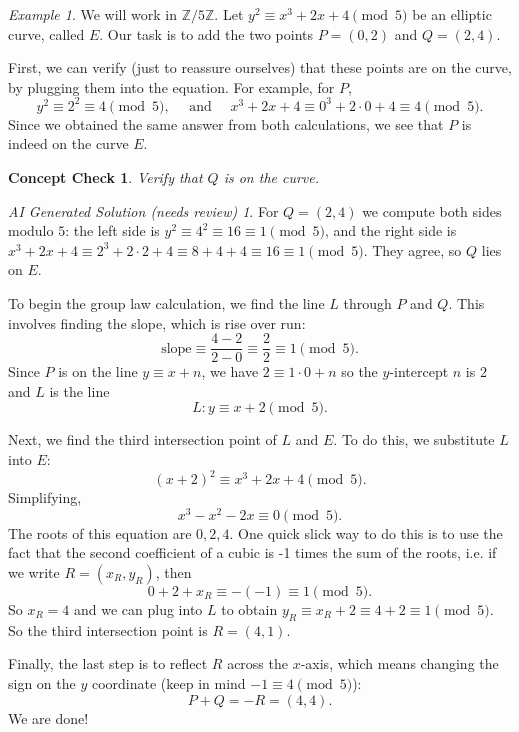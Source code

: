 \documentclass{article}
\theoremstyle{plain}
\newtheorem{checkin}[theorem]{Concept Check}
\theoremstyle{definition}
\theoremstyle{remark}
\newtheorem{example}[theorem]{Example}
\newtheorem*{aisolution}{AI Generated Solution (needs review)}
\numberwithin{theorem}{section}
\newcommand{\ZZ}{\mathbb{Z}}
\begin{document}
\begin{example}
We will work in $\ZZ/5\ZZ$.
    Let $y^2 \equiv x^3 + 2x + 4 \pmod{5}$ be an elliptic curve, called $E$.  Our task is to add the two points $P = (0,2)$ and $Q = (2,4)$.  
    
    First, we can verify (just to reassure ourselves) that these points are on the curve, by plugging them into the equation.  For example, for $P$,
    \[
    y^2 \equiv 2^2 \equiv 4 \pmod{5}, \quad
    \text{ and } \quad
    x^3 + 2x + 4 \equiv 0^3 + 2 \cdot 0 + 4 \equiv 4 \pmod{5}.
    \]
    Since we obtained the same answer from both calculations, we see that $P$ is indeed on the curve $E$.  
    
    \begin{checkin}
        Verify that $Q$ is on the curve.
    \end{checkin}
    \begin{aisolution}
    For $Q = (2,4)$ we compute both sides modulo $5$: the left side is $y^2 \equiv 4^2 \equiv 16 \equiv 1 \pmod 5$, and the right side is $x^3 + 2x + 4 \equiv 2^3 + 2\cdot 2 + 4 \equiv 8 + 4 + 4 \equiv 16 \equiv 1 \pmod 5$.  They agree, so $Q$ lies on $E$.
    \end{aisolution}

    To begin the group law calculation, we find the line $L$ through $P$ and $Q$.  This involves finding the slope, which is rise over run:
    \[
    \text{slope} \equiv  \frac{4-2}{2-0} \equiv \frac{2}{2} \equiv 1 \pmod{5}.
    \]
    Since $P$ is on the line $y \equiv x + n$, we have $2 \equiv 1 \cdot 0 + n$ so the $y$-intercept $n$ is $2$ and $L$ is the line
    \[
    L : y \equiv x + 2 \pmod{5}.
    \]

    Next, we find the third intersection point of $L$ and $E$.  To do this, we substitute $L$ into $E$:
    \[
    (x+2)^2 \equiv x^3  + 2 x + 4 \pmod{5}.
    \]
    Simplifying,
    \[
    x^3 - x^2 -2x \equiv 0 \pmod{5}.
    \]
    The roots of this equation are $0,2,4$.  One quick slick way to do this is to use the fact that the second coefficient of a cubic is -1 times the sum of the roots, i.e. if we write $R = (x_R,y_R)$, then 
    \[
    0 + 2 + x_R \equiv -(-1) \equiv 1 \pmod{5}.
    \]
    So $x_R = 4$ and we can plug into $L$ to obtain $y_R \equiv x_R + 2 \equiv 4 + 2 \equiv 1 \pmod{5}$.
    So the third intersection point is $R = (4,1)$.

    Finally, the last step is to reflect $R$ across the $x$-axis, which means changing the sign on the $y$ coordinate (keep in mind $-1 \equiv 4 \pmod{5}$):
    \[
    P + Q = -R = (4,4).
    \]
    We are done!
\end{example}
\end{document}
